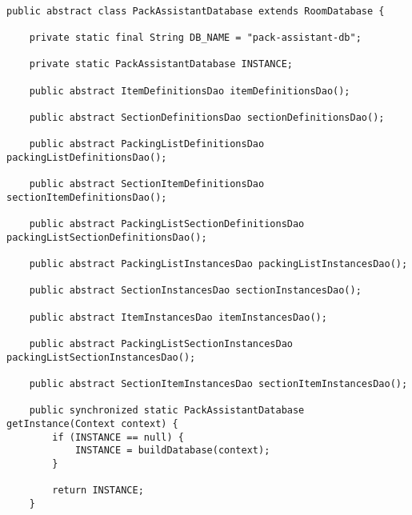 \documentclass[a4paper,12pt]{article}
\begin{document}
\begin{lstlisting}[caption= Abstrakcyjne metody oraz użycie wzorca singletonu w klasie PackAssistantDatabase,label={lst:Database-class-singleton}]

public abstract class PackAssistantDatabase extends RoomDatabase {

    private static final String DB_NAME = "pack-assistant-db";

    private static PackAssistantDatabase INSTANCE;

    public abstract ItemDefinitionsDao itemDefinitionsDao();

    public abstract SectionDefinitionsDao sectionDefinitionsDao();

    public abstract PackingListDefinitionsDao packingListDefinitionsDao();

    public abstract SectionItemDefinitionsDao sectionItemDefinitionsDao();

    public abstract PackingListSectionDefinitionsDao packingListSectionDefinitionsDao();

    public abstract PackingListInstancesDao packingListInstancesDao();

    public abstract SectionInstancesDao sectionInstancesDao();

    public abstract ItemInstancesDao itemInstancesDao();

    public abstract PackingListSectionInstancesDao packingListSectionInstancesDao();

    public abstract SectionItemInstancesDao sectionItemInstancesDao();

    public synchronized static PackAssistantDatabase getInstance(Context context) {
        if (INSTANCE == null) {
            INSTANCE = buildDatabase(context);
        }

        return INSTANCE;
    }

\end{lstlisting}
\end{document}
